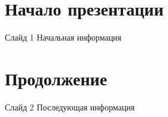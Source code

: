 \documentclass[10pt, hideallsubsections]{beamer} %
\begin{document}
    \section{Начало презентации}
    \begin{frame}{Слайд 1}
        Начальная информация
    \end{frame}
    \section{Продолжение}
    \begin{frame}{Слайд 2}
        Последующая информация
    \end{frame}
\end{document}
